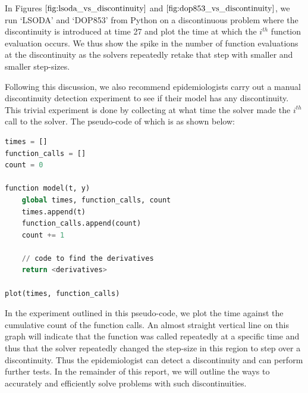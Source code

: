 In Figures $\ref{fig:lsoda_vs_discontinuity}$ and $\ref{fig:dop853_vs_discontinuity}$, we run `LSODA' and `DOP853' from Python on a discontinuous problem where the discontinuity is introduced at time 27 and plot the time at which the $i^{th}$ function evaluation occurs. We thus show the spike in the number of function evaluations at the discontinuity as the solvers repeatedly retake that step with smaller and smaller step-sizes.

Following this discussion, we also recommend epidemiologists carry out a manual discontinuity detection experiment to see if their model has any discontinuity. This trivial experiment is done by collecting at what time the solver made the $i^{th}$ call to the solver. The pseudo-code of which is as shown below:

\begin{minipage}{\linewidth}
\begin{lstlisting}[language=Python]
times = []
function_calls = []
count = 0

function model(t, y)
    global times, function_calls, count
    times.append(t)
    function_calls.append(count)
    count += 1 

    // code to find the derivatives
    return <derivatives>

plot(times, function_calls)
\end{lstlisting}
\end{minipage}

In the experiment outlined in this pseudo-code, we plot the time against the cumulative count of the function calls. An almost straight vertical line on this graph will indicate that the function was called repeatedly at a specific time and thus that the solver repeatedly changed the step-size in this region to step over a discontinuity. Thus the epidemiologist can detect a discontinuity and can perform further tests. In the remainder of this report, we will outline the ways to accurately and efficiently solve problems with such discontinuities.


